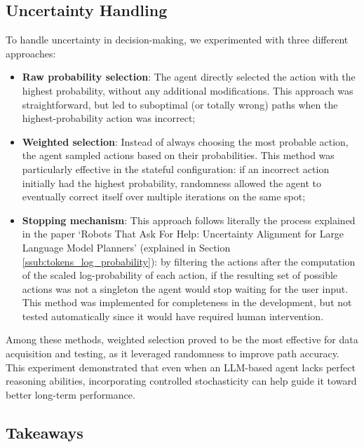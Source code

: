 \subsection{Uncertainty Handling}
\label{sub:uncertainty_handling} To handle uncertainty in decision-making, we
experimented with three different approaches:
\begin{itemize}
  \item \textbf{Raw probability selection}: The agent directly selected the action
    with the highest probability, without any additional modifications. This approach
    was straightforward, but led to suboptimal (or totally wrong) paths when the
    highest-probability action was incorrect;

  \item \textbf{Weighted selection}: Instead of always choosing the most probable
    action, the agent sampled actions based on their probabilities. This method was
    particularly effective in the stateful configuration: if an incorrect action
    initially had the highest probability, randomness allowed the agent to eventually
    correct itself over multiple iterations on the same spot;

  \item \textbf{Stopping mechanism}: This approach follows literally the process
    explained in the paper `Robots That Ask For Help: Uncertainty Alignment for Large
    Language Model Planners' (explained in Section \ref{ssub:tokens_log_probability}):
    by filtering the actions after the computation of the scaled log-probability
    of each action, if the resulting set of possible actions was not a singleton
    the agent would stop waiting for the user input. This method was implemented
    for completeness in the development, but not tested automatically since it
    would have required human intervention.
\end{itemize}
Among these methods, weighted selection proved to be the most effective for data
acquisition and testing, as it leveraged randomness to improve path accuracy.
This experiment demonstrated that even when an LLM-based agent lacks perfect
reasoning abilities, incorporating controlled stochasticity can help guide it toward
better long-term performance.

\subsection{Takeaways}

